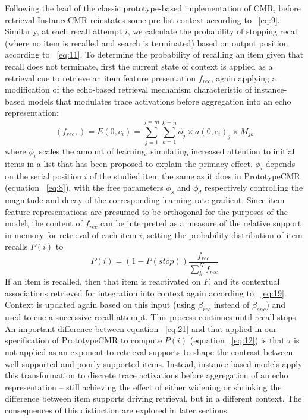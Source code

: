 {}\markdownRendererInterblockSeparator
{}Following the lead of the classic prototype-based implementation of CMR, before retrieval InstanceCMR reinstates some pre-list context according to ~\ref{eq:9}. Similarly, at each recall attempt $i$, we calculate the probability of stopping recall (where no item is recalled and search is terminated) based on output position according to ~\ref{eq:11}.\markdownRendererInterblockSeparator
{}To determine the probability of recalling an item given that recall does not terminate, first the current state of context is applied as a retrieval cue to retrieve an item feature presentation $f_{rec}$, again applying a modification of the echo-based retrieval mechanism characteristic of instance-based models that modulates trace activations before aggregation into an echo representation:\markdownRendererInterblockSeparator
{}\begin{equation} \label{eq:20} (f_{rec},) = E(0, c_i) = \sum^{j=m}_{j=1}\sum^{k=n}_{k=1} {\phi}_j \times a(0, c_i)_j \times M_{jk} \end{equation}\markdownRendererInterblockSeparator
{}where ${\phi}_i$ scales the amount of learning, simulating increased attention to initial items in a list that has been proposed to explain the primacy effect. ${\phi}_i$ depends on the serial position $i$ of the studied item the same as it does in PrototypeCMR (equation ~\ref{eq:8}), with the free parameters ${\phi}_s$ and ${\phi}_d$ respectively controlling the magnitude and decay of the corresponding learning-rate gradient.\markdownRendererInterblockSeparator
{}Since item feature representations are presumed to be orthogonal for the purposes of the model, the content of $f_{rec}$ can be interpreted as a measure of the relative support in memory for retrieval of each item $i$, setting the probability distribution of item recalls $P(i)$ to \markdownRendererInterblockSeparator
{}\begin{equation} \label{eq:21} P(i) = (1-P(stop))\frac{f_{rec}}{\sum_{k}^{N}f_{rec}} \end{equation}\markdownRendererInterblockSeparator
{}If an item is recalled, then that item is reactivated on $F$, and its contextual associations retrieved for integration into context again according to ~\ref{eq:19}. Context is updated again based on this input (using $\beta_{rec}$ instead of $\beta_{enc}$) and used to cue a successive recall attempt. This process continues until recall stops.\markdownRendererInterblockSeparator
{}An important difference between equation ~\ref{eq:21} and that applied in our specification of PrototypeCMR to compute $P(i)$ (equation ~\ref{eq:12}) is that $\tau$ is not applied as an exponent to retrieval supports to shape the contrast between well-supported and poorly supported items. Instead, instance-based models apply this transformation to discrete trace activations before aggregation of an echo representation -- still achieving the effect of either widening or shrinking the difference between item supports driving retrieval, but in a different context. The consequences of this distinction are explored in later sections. \relax